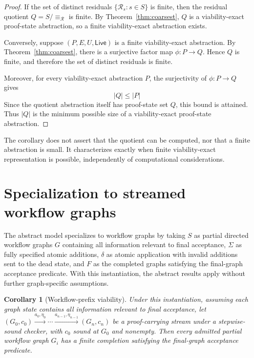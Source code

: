 \documentclass[11pt]{article}
\newtheorem{corollary}[corollary]{Corollary}
\theoremstyle{definition}
\newcommand{\States}{S}
\newcommand{\Additions}{\Sigma}
\newcommand{\Accept}{F}
\newcommand{\Residual}{\mathcal R}
\newcommand{\Live}{\mathsf{Live}}
\newcommand{\ResidualEq}{\equiv_{\Residual}}
\begin{document}
\begin{proof}
If the set of distinct residuals $\{\Residual_s : s\in\States\}$ is finite,
then the residual quotient $Q=\States/{\ResidualEq}$ is finite. By
Theorem~\ref{thm:coarsest}, $Q$ is a viability-exact
proof-state abstraction, so a finite viability-exact abstraction exists.

Conversely, suppose $(P,E,U,\Live)$ is a finite viability-exact abstraction.
By Theorem~\ref{thm:coarsest}, there is a surjective factor map
$\phi:P\to Q$. Hence $Q$ is finite, and therefore the set of distinct
residuals is finite.

Moreover, for every viability-exact abstraction $P$, the surjectivity of
$\phi:P\to Q$ gives
\[
|Q|\le |P|
\]
Since the quotient abstraction itself has proof-state set $Q$, this bound is
attained. Thus $|Q|$ is the minimum possible size of a viability-exact
proof-state abstraction.
\end{proof}

The corollary does not assert that the quotient can be computed, nor that a
finite abstraction is small. It characterizes exactly when finite viability-exact representation is possible, independently of computational considerations.

\section{Specialization to streamed workflow graphs}\label{sec:workflow}

The abstract model specializes to workflow graphs by taking $\States$ as
partial directed workflow graphs $G$ containing all information relevant to
final acceptance, $\Additions$ as fully specified atomic additions, $\delta$
as atomic application with invalid additions sent to the dead state, and
$\Accept$ as the completed graphs satisfying the final-graph acceptance
predicate. With this instantiation, the abstract results apply without
further graph-specific assumptions.

\begin{corollary}[Workflow-prefix viability]\label{cor:workflow-viability}
Under this instantiation, assuming each graph state contains all information relevant to final acceptance, let $(G_0,c_0)\xrightarrow{a_0,\eta_0}\cdots\xrightarrow{a_{n-1},\eta_{n-1}}(G_n,c_n)$ be a proof-carrying stream under a stepwise-sound checker, with $c_0$ sound at $G_0$ and nonempty. Then every admitted partial workflow graph $G_i$ has a finite completion satisfying the final-graph acceptance predicate.
\end{corollary}
\end{document}
